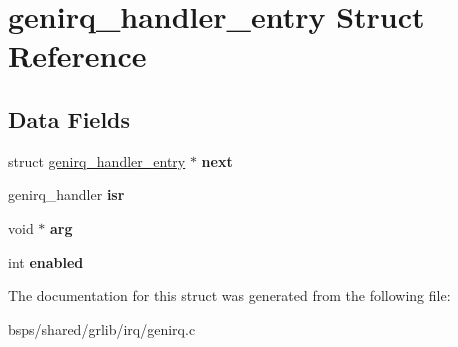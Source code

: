 \hypertarget{structgenirq__handler__entry}{}\section{genirq\+\_\+handler\+\_\+entry Struct Reference}
\label{structgenirq__handler__entry}
\subsection*{Data Fields}
\begin{DoxyCompactItemize}
\item 
\mbox{\label{structgenirq__handler__entry_a04bef998bd3c8e34017a935936725c57}} 
struct \mbox{\hyperlink{structgenirq__handler__entry}{genirq\+\_\+handler\+\_\+entry}} $\ast$ {\bfseries next}
\item 
\mbox{\label{structgenirq__handler__entry_a40a045ca9f7b3640b83356ffe65bc54d}} 
genirq\+\_\+handler {\bfseries isr}
\item 
\mbox{\label{structgenirq__handler__entry_a24e63b0a9973018ac0ea32eb7f7963f4}} 
void $\ast$ {\bfseries arg}
\item 
\mbox{\label{structgenirq__handler__entry_a0a91adb108da62b831bf620812094d87}} 
int {\bfseries enabled}
\end{DoxyCompactItemize}


The documentation for this struct was generated from the following file\+:\begin{DoxyCompactItemize}
\item 
bsps/shared/grlib/irq/genirq.\+c\end{DoxyCompactItemize}
